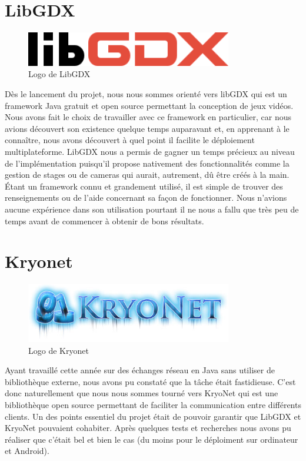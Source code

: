 \documentclass{report}
\begin{document}
\chapter{LibGDX}
\begin{figure}[H]
	\centering\includegraphics[width=9cm]{libgdx}
	\caption{Logo de LibGDX}
\end{figure}
Dès le lancement du projet, nous nous sommes orienté vers libGDX qui est un
framework Java gratuit et open source permettant la conception de jeux vidéos.
Nous avons fait le choix de travailler avec ce framework en particulier, car
nous avions découvert son existence quelque temps auparavant et, en apprenant à le connaître,
nous avons découvert à quel point il facilite le déploiement multiplateforme.
LibGDX nous a permis de gagner un temps précieux au niveau de l’implémentation
puisqu’il propose nativement des fonctionnalités comme la gestion de stages ou
de cameras qui aurait, autrement, dû être créés à la main.
Étant un framework connu et grandement utilisé, il est simple de trouver des
renseignements ou de l’aide concernant sa façon de fonctionner. Nous n’avions
aucune expérience dans son utilisation pourtant il ne nous a fallu que très peu
 de temps avant de commencer à obtenir de bons résultats.

\chapter{Kryonet}
\begin{figure}[H]
	\centering\includegraphics[width=9cm]{kryonet}
	\caption{Logo de Kryonet}
\end{figure}
Ayant travaillé cette année sur des échanges réseau en Java sans utiliser de bibliothèque externe, nous avons pu constaté que la tâche était fastidieuse. C'est donc naturellement que nous
nous sommes tourné vers KryoNet qui est une bibliothèque open source permettant de faciliter la communication entre différents clients. Un des points essentiel du projet était de pouvoir
garantir que LibGDX et KryoNet pouvaient cohabiter. Après quelques tests et recherches nous avons pu réaliser que c'était bel et bien le cas (du moins pour le déploiment sur ordinateur et Android).
\end{document}
